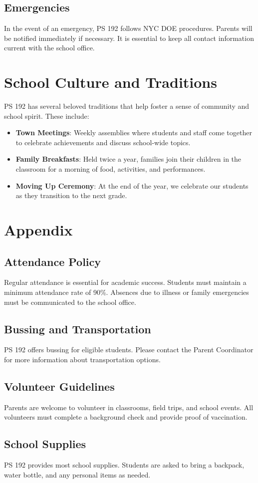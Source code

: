 \documentclass[11pt]{article}
\begin{document}
\subsection{Emergencies}
\label{sec:org33d39c7}
In the event of an emergency, PS 192 follows NYC DOE procedures. Parents will be notified immediately if necessary. It is essential to keep all contact information current with the school office.

\section{School Culture and Traditions}
\label{sec:org1203eca}
PS 192 has several beloved traditions that help foster a sense of community and school spirit. These include:

\begin{itemize}
\item \textbf{\textbf{Town Meetings}}: Weekly assemblies where students and staff come together to celebrate achievements and discuss school-wide topics.
\item \textbf{\textbf{Family Breakfasts}}: Held twice a year, families join their children in the classroom for a morning of food, activities, and performances.
\item \textbf{\textbf{Moving Up Ceremony}}: At the end of the year, we celebrate our students as they transition to the next grade.
\end{itemize}

\section{Appendix}
\label{sec:orgc3868b1}
\subsection{Attendance Policy}
\label{sec:org5750912}
Regular attendance is essential for academic success. Students must maintain a minimum attendance rate of 90\%. Absences due to illness or family emergencies must be communicated to the school office.

\subsection{Bussing and Transportation}
\label{sec:org4755b60}
PS 192 offers bussing for eligible students. Please contact the Parent Coordinator for more information about transportation options.

\subsection{Volunteer Guidelines}
\label{sec:orgd912ac4}
Parents are welcome to volunteer in classrooms, field trips, and school events. All volunteers must complete a background check and provide proof of vaccination.

\subsection{School Supplies}
\label{sec:org35e40d7}
PS 192 provides most school supplies. Students are asked to bring a backpack, water bottle, and any personal items as needed.
\end{document}
